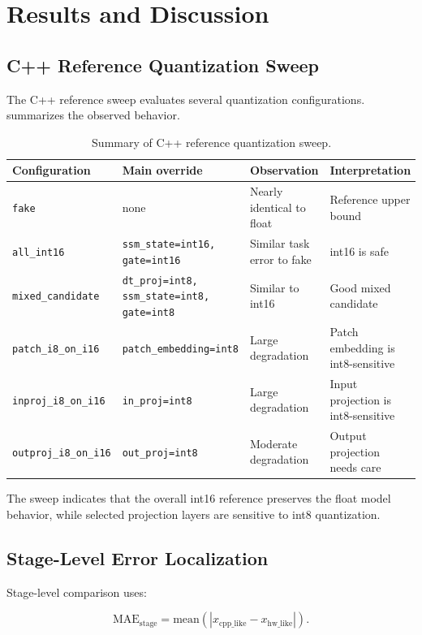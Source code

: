 \chapter{Results and Discussion}
\label{ch:results}

\section{C++ Reference Quantization Sweep}

The C++ reference sweep evaluates several quantization configurations.  summarizes the observed behavior.

\begin{table}[h]
\centering
\caption{Summary of C++ reference quantization sweep.}
\label{tab:cpp-sweep}
\begin{tabular}{llll}
\toprule
Configuration & Main override & Observation & Interpretation \\
\midrule
\texttt{fake} & none & Nearly identical to float & Reference upper bound \\
\texttt{all\_int16} & \texttt{ssm\_state=int16, gate=int16} & Similar task error to fake & int16 is safe \\
\texttt{mixed\_candidate} & \texttt{dt\_proj=int8, ssm\_state=int8, gate=int8} & Similar to int16 & Good mixed candidate \\
\texttt{patch\_i8\_on\_i16} & \texttt{patch\_embedding=int8} & Large degradation & Patch embedding is int8-sensitive \\
\texttt{inproj\_i8\_on\_i16} & \texttt{in\_proj=int8} & Large degradation & Input projection is int8-sensitive \\
\texttt{outproj\_i8\_on\_i16} & \texttt{out\_proj=int8} & Moderate degradation & Output projection needs care \\
\bottomrule
\end{tabular}
\end{table}

The sweep indicates that the overall int16 reference preserves the float model behavior, while selected projection layers are sensitive to int8 quantization.

\section{Stage-Level Error Localization}

Stage-level comparison uses:

\begin{equation}
  \mathrm{MAE}_{\mathrm{stage}} =
  \mathrm{mean}\left(|x_{\mathrm{cpp\_like}} - x_{\mathrm{hw\_like}}|\right).
\end{equation}

